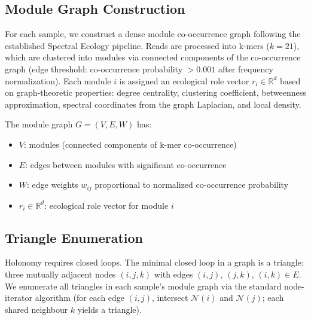 \documentclass{../yalumba}
\begin{document}
\subsection{Module Graph Construction}

For each sample, we construct a dense module co-occurrence graph following
the established Spectral Ecology pipeline.  Reads are processed into k-mers
($k = 21$), which are clustered into modules via connected components of the
co-occurrence graph (edge threshold: co-occurrence probability $> 0.001$
after frequency normalization).  Each module $i$ is assigned an ecological
role vector $r_i \in \mathbb{R}^d$ based on graph-theoretic properties:
degree centrality, clustering coefficient, betweenness approximation,
spectral coordinates from the graph Laplacian, and local density.


The module graph $G = (V, E, W)$ has:
\begin{itemize}
  \item $V$: modules (connected components of k-mer co-occurrence)
  \item $E$: edges between modules with significant co-occurrence
  \item $W$: edge weights $w_{ij}$ proportional to normalized co-occurrence
    probability
  \item $r_i \in \mathbb{R}^d$: ecological role vector for module $i$
\end{itemize}

\subsection{Triangle Enumeration}
\label{sec:triangles}

Holonomy requires closed loops.  The minimal closed loop in a graph is a
triangle: three mutually adjacent nodes $(i, j, k)$ with edges $(i,j)$,
$(j,k)$, $(i,k) \in E$.  We enumerate all triangles in each sample's
module graph via the standard node-iterator algorithm (for each edge
$(i,j)$, intersect $\mathcal{N}(i)$ and $\mathcal{N}(j)$; each shared
neighbour $k$ yields a triangle).
\end{document}
